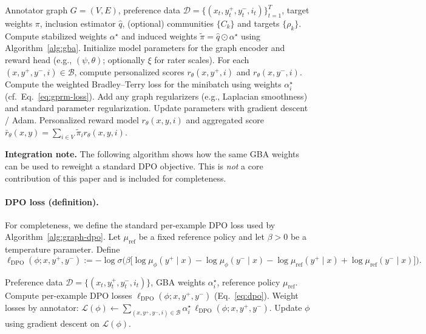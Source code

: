 \documentclass{article}
\theoremstyle{plain}
\theoremstyle{definition}
\theoremstyle{remark}
\begin{document}
\begin{algorithm}[h]
\caption{Core: GPRM training with GBA weights}
\label{alg:gprm}
\begin{algorithmic}[1]
\REQUIRE Annotator graph $G=(V,E)$, preference data $\mathcal{D}=\{(x_t,y_t^+,y_t^-,i_t)\}_{t=1}^T$, target weights $\pi$, inclusion estimator $\hat q$, (optional) communities $\{C_k\}$ and targets $\{\rho_k\}$.
\STATE Compute stabilized weights $\alpha^\star$ and induced weights $\tilde\pi=\hat q\odot\alpha^\star$ using Algorithm~\ref{alg:gba}.
\STATE Initialize model parameters for the graph encoder and reward head (e.g., $(\psi,\theta)$; optionally $\xi$ for rater scales).
    \STATE For each $(x,y^+,y^-,i)\in\mathcal{B}$, compute personalized scores $r_\theta(x,y^+,i)$ and $r_\theta(x,y^-,i)$.
    \STATE Compute the weighted Bradley--Terry loss for the minibatch using weights $\alpha_i^\star$ (cf.\ Eq.~\eqref{eq:gprm-loss}).
    \STATE Add any graph regularizers (e.g., Laplacian smoothness) and standard parameter regularization.
    \STATE Update parameters with gradient descent / Adam.
\ENDFOR
\RETURN Personalized reward model $r_\theta(x,y,i)$ and aggregated score $\bar r_\theta(x,y)=\sum_{i\in V}\tilde\pi_i r_\theta(x,y,i)$.
\end{algorithmic}
\end{algorithm}

\noindent\textbf{Integration note.}
The following algorithm shows how the same GBA weights can be used to reweight a
standard DPO objective. This is \emph{not} a core contribution of this paper and
is included for completeness.

\paragraph{DPO loss (definition).}
For completeness, we define the standard per-example DPO loss used by Algorithm~\ref{alg:graph-dpo}.
Let $\mu_{\mathrm{ref}}$ be a fixed reference policy and let $\beta>0$ be a temperature parameter. Define
\begin{equation}
\ell_{\mathrm{DPO}}(\phi; x,y^+,y^-)
:=
- \log \sigma\!\Big(
\beta\big[
\log \mu_\phi(y^+\!\mid x)-\log \mu_\phi(y^-\!\mid x)
-\log \mu_{\mathrm{ref}}(y^+\!\mid x)+\log \mu_{\mathrm{ref}}(y^-\!\mid x)
\big]
\Big).
\label{eq:dpo}
\end{equation}

\begin{algorithm}[h]
\caption{Integration: Graph-weighted DPO training using GBA weights}
\label{alg:graph-dpo}
\begin{algorithmic}[1]
\REQUIRE Preference data $\mathcal{D}=\{(x_t,y_t^+,y_t^-,i_t)\}$, GBA weights $\alpha_i^\star$, reference policy $\mu_{\mathrm{ref}}$.
    \STATE Compute per-example DPO losses $\ell_{\mathrm{DPO}}(\phi;x,y^+,y^-)$ (Eq.~\eqref{eq:dpo}).
    \STATE Weight losses by annotator: $\mathcal{L}(\phi)\leftarrow \sum_{(x,y^+,y^-,i)\in\mathcal{B}} \alpha_i^\star\,\ell_{\mathrm{DPO}}(\phi;x,y^+,y^-)$.
    \STATE Update $\phi$ using gradient descent on $\mathcal{L}(\phi)$.
\ENDFOR
\end{algorithmic}
\end{algorithm}
\end{document}
